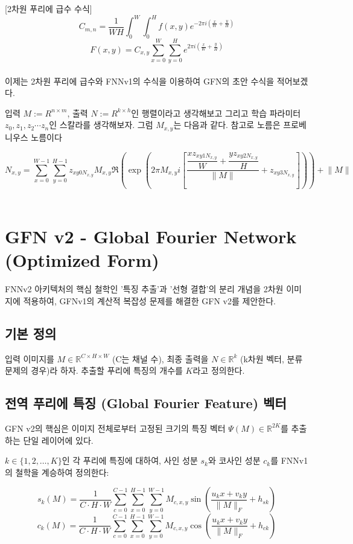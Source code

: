 \documentclass{book}
\begin{document}
[2차원 푸리에 급수 수식]
\[
C_{m,n} =\frac{1}{WH} \int_0^W \int_0^H f(x,y) e^{-2\pi i \left ( \frac{x}{W} + \frac{y}{H} \right )}
\]
\[
F(x,y)= C_{x,y} \sum_{x=0}^W \sum_{y=0}^H e^{2 \pi i \left ( \frac{x}{W} + \frac{y}{H} \right )}
\]\\

이제는 2차원 푸리에 급수와 FNNv1의 수식을 이용하여 GFN의 초안 수식을 적어보겠다.

입력 $M:=R^{n \times m}$, 출력 $N:=R^{k \times h}$인 행렬이라고 생각해보고 그리고 학습 파라미터 $z_{0}, z_{1}, z_{2} \cdots z_{n}$인 스칼라를 생각해보자. 그럼 $M_{x,y}$는 다음과 같다. 참고로 노름은 프로베니우스 노름이다

\[
N_{x,y} = \sum_{x=0}^{W-1} \sum_{y=0}^{H-1} z_{xy0N_{x,y}} M_{x,y} \Re \left ( \exp \left (2 \pi M_{x,y} i \left [ \dfrac{ \dfrac{xz_{xy1N_{x,y}}}{W} + \dfrac{yz_{xy2N_{x,y}}}{H} }{\lVert M \lVert} + z_{xy3N_{x,y}} \right ] \right ) \right ) + \lVert M \rVert
\]\\

\section{GFN v2 - Global Fourier Network (Optimized Form)}

FNNv2 아키텍처의 핵심 철학인 '특징 추출'과 '선형 결합'의 분리 개념을 2차원 이미지에 적용하여, GFNv1의 계산적 복잡성 문제를 해결한 GFN v2를 제안한다.

\subsection{기본 정의}
입력 이미지를 $M \in \mathbb{R}^{C \times H \times W}$ (C는 채널 수), 최종 출력을 $N \in \mathbb{R}^k$ (k차원 벡터, 분류 문제의 경우)라 하자.
추출할 푸리에 특징의 개수를 $K$라고 정의한다.

\subsection{전역 푸리에 특징 (Global Fourier Feature) 벡터}
GFN v2의 핵심은 이미지 전체로부터 고정된 크기의 특징 벡터 $\Psi(M) \in \mathbb{R}^{2K}$를 추출하는 단일 레이어에 있다.

$k \in \{1, 2, \dots, K\}$인 각 푸리에 특징에 대하여, 사인 성분 $s_k$와 코사인 성분 $c_k$를 FNNv1의 철학을 계승하여 정의한다:

\[
s_k(M) = \frac{1}{C \cdot H \cdot W} \sum_{c=0}^{C-1} \sum_{x=0}^{H-1} \sum_{y=0}^{W-1} M_{c,x,y} \sin\left( \frac{u_k x + v_k y}{\lVert M \rVert_F} + h_{sk} \right)
\]
\[
c_k(M) = \frac{1}{C \cdot H \cdot W} \sum_{c=0}^{C-1} \sum_{x=0}^{H-1} \sum_{y=0}^{W-1} M_{c,x,y} \cos\left( \frac{u_k x + v_k y}{\lVert M \rVert_F} + h_{ck} \right)
\]
\end{document}
